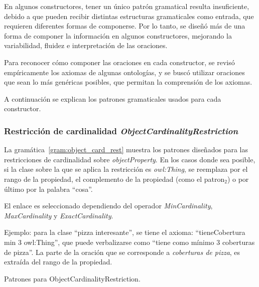 En algunos constructores, tener un único patrón gramatical resulta insuficiente, debido a que pueden recibir distintas estructuras gramaticales como entrada, que requieren diferentes formas de componerse. Por lo tanto, se diseñó más de una forma de componer la información en algunos constructores, mejorando la variabilidad, fluidez e interpretación de las oraciones. 

Para reconocer cómo componer las oraciones en cada constructor, se revisó empíricamente los axiomas de algunas ontologías, y se buscó utilizar oraciones que sean lo más genéricas posibles, que permitan la comprensión de los axiomas. 

A continuación se explican los patrones gramaticales usados para cada constructor. %

\subsubsection{Restricción de cardinalidad \emph{ObjectCardinalityRestriction}}

La gramática~\ref{gram:object_card_rest} muestra los patrones diseñados para las restricciones de cardinalidad sobre \emph{objectProperty}. En los casos donde sea posible, si la clase sobre la que se aplica la restricción es \emph{owl:Thing}, se reemplaza por el rango de la propiedad, el complemento de la propiedad (como el patron$_2$) o por último por la palabra ``cosa''.

El enlace es seleccionado dependiendo del operador \emph{MinCardinality}, \emph{MaxCardinality} y \emph{ExactCardinality}.

Ejemplo: para la clase ``pizza interesante'', se tiene el axioma: ``tieneCobertura min 3 owl:Thing'', que puede verbalizarse como ``tiene como mínimo 3 coberturas de pizza''. La parte de la oración que se corresponde a \emph{coberturas de pizza}, es extraída del rango de la propiedad.

\begin{GrammarEnv}
\begin{grammar}
\end{grammar}
\caption{Patrones para ObjectCardinalityRestriction.}\label{gram:object_card_rest}
\end{GrammarEnv}

